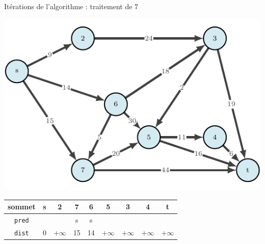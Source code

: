 \begin{frame}{Itérations de l'algorithme : traitement de $7$}
    \begin{center}
        \includegraphics[height=.6\textheight]{fig/ordinal-0.pdf}      
    \begin{tabular}{c|cccccccc}
        
        sommet & s       &2      &7      &6      &5      &3      &4      &t      \\
        \hline
        \texttt{pred} & &       &s      &s      &       &       &       &       \\
        \texttt{dist} & 0       &$+\infty$    &15     &14     &$+\infty$    &$+\infty$    &$+\infty$    &$+\infty$    \\
    \end{tabular}
\end{center}
\end{frame}

